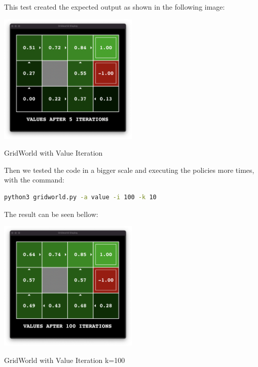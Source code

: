 \documentclass{article}
\begin{document}
This test created the expected output as shown in the following image:

\begin{table}[ht!]
  \begin{center}
    \includegraphics[width=0.5\textwidth]{images/gridWorld-ex2.png}
  \end{center}
\caption{GridWorld with Value Iteration}
\end{table}

Then we tested the code in a bigger scale and executing the policies more times, with the command:

\begin{lstlisting}[language=bash, frame=tlbr, framesep=6pt, backgroundcolor=\color{light-gray}]
  python3 gridworld.py -a value -i 100 -k 10
\end{lstlisting}

The result can be seen bellow:

\begin{table}[ht!]
  \begin{center}
    \includegraphics[width=0.5\textwidth]{images/gridWorld-ex3.png}
  \end{center}
\caption{GridWorld with Value Iteration k=100}
\end{table}
\end{document}
